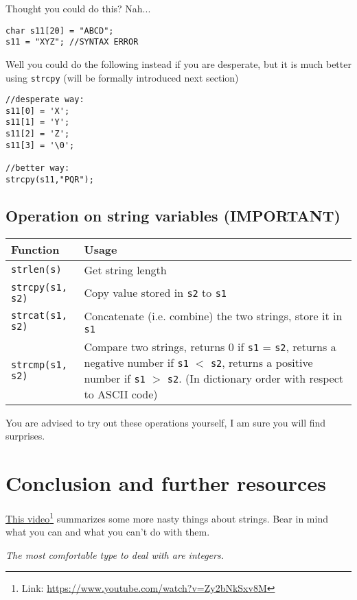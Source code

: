 Thought you could do this? Nah...

\begin{lstlisting}
char s11[20] = "ABCD";
s11 = "XYZ"; //SYNTAX ERROR
\end{lstlisting}

Well you could do the following instead if you are desperate, but it is much better using \texttt{strcpy} (will be formally introduced next section)

\begin{lstlisting}
//desperate way:
s11[0] = 'X'; 
s11[1] = 'Y'; 
s11[2] = 'Z'; 
s11[3] = '\0'; 

//better way:
strcpy(s11,"PQR");
\end{lstlisting}


\subsection{Operation on string variables (IMPORTANT)}

\begin{table}[h]
    \centering
    \begin{tabular}{|m{9em}|m{25em}|}
        \hline
        \textbf{Function} & 
        Usage 
        \\ \hline \hline
        
        \texttt{strlen(s)} &
        Get string length
        \\ \hline
        
        \texttt{strcpy(s1, s2)} &
        Copy value stored in \texttt{s2} to \texttt{s1} 
        \\ \hline
        
        \texttt{strcat(s1, s2)} &
        Concatenate (i.e. combine) the two strings, store it in \texttt{s1} 
        \\ \hline
        
        \texttt{strcmp(s1, s2)} &
        Compare two strings, returns 0 if \texttt{s1} = \texttt{s2}, returns a negative number if \texttt{s1} $<$ \texttt{s2}, returns a positive number if \texttt{s1} $>$ \texttt{s2}. (In dictionary order with respect to ASCII code)
        \\ \hline
    \end{tabular}
\end{table}

You are advised to try out these operations yourself, I am sure you will find surprises.

\section{Conclusion and further resources}

\href{https://www.youtube.com/watch?v=Zy2bNkSxv8M}{This video}\footnote{Link: \href{https://www.youtube.com/watch?v=Zy2bNkSxv8M}{https://www.youtube.com/watch?v=Zy2bNkSxv8M}} summarizes some more nasty things about strings. Bear in mind what you can and what you can't do with them.
\vspace{6mm}

\begin{center}
\textit{The most comfortable type to deal with are integers.}
\end{center}
